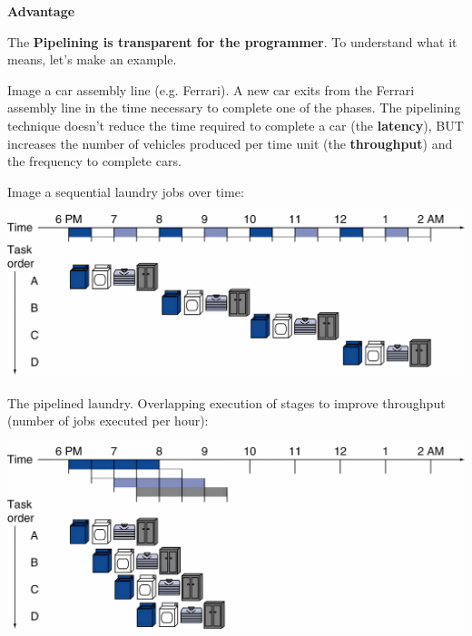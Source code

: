 \documentclass[a4paper]{article}
\begin{document}
    \begin{flushleft}
        \textcolor{Green3}{ \textbf{Advantage}}
    \end{flushleft}
    The \textbf{Pipelining is transparent for the programmer}. To understand what it means, let's make an example.

    \begin{examplebox}
        Image a car assembly line (e.g. Ferrari). A new car exits from the Ferrari assembly line in the time necessary to complete one of the phases. The pipelining technique doesn't reduce the time required to complete a car (the \textbf{latency}), BUT increases the number of vehicles produced per time unit (the \textbf{throughput}) and the frequency to complete cars.
    \end{examplebox}

    \begin{examplebox}
        Image a sequential laundry jobs over time:\cite{pipelining-slides}
        \begin{center}
            \centering
            \includegraphics[width=.9\textwidth]{img/pipelining-example-1.pdf}
        \end{center}
        The pipelined laundry. Overlapping execution of stages to improve throughput (number of jobs executed per hour):\cite{pipelining-slides}
        \begin{center}
            \centering
            \includegraphics[width=.9\textwidth]{img/pipelining-example-2.pdf}
        \end{center}
    \end{examplebox}
\end{document}
